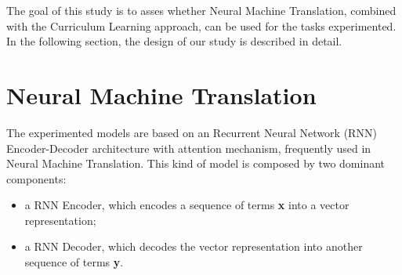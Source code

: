 The goal of this study is to asses whether Neural Machine Translation, combined with the Curriculum Learning approach, 
can be used for the tasks experimented. In the following section, the design of our study is described in detail.


\section{Neural Machine Translation}
The experimented models are based on an Recurrent Neural Network (RNN) Encoder-Decoder
architecture with attention mechanism, frequently used in Neural Machine Translation. This kind of model is composed by two
dominant components:

\begin{itemize}
    \item a RNN Encoder, which encodes a sequence of terms \textbf{x} into a vector representation;
    \item a RNN Decoder, which decodes the vector representation into another sequence of terms \textbf{y}.
\end{itemize}

